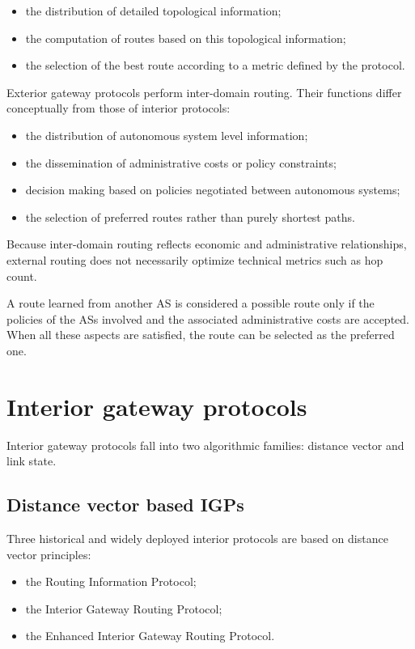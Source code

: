 \begin{itemize}
\item the distribution of detailed topological information;
\item the computation of routes based on this topological information;
\item the selection of the best route according to a metric defined by the protocol.
\end{itemize}

Exterior gateway protocols perform inter-domain routing. Their functions differ conceptually from those of interior protocols:

\begin{itemize}
\item the distribution of autonomous system level information;
\item the dissemination of administrative costs or policy constraints;
\item decision making based on policies negotiated between autonomous systems;
\item the selection of preferred routes rather than purely shortest paths.
\end{itemize}

Because inter-domain routing reflects economic and administrative relationships, external routing does not necessarily optimize technical metrics such as hop count.

A route learned from another AS is considered a possible route only if the
policies of the ASs involved and the associated administrative costs are
accepted. When all these aspects are satisfied, the route can be selected as the
preferred one.


\section{Interior gateway protocols}

Interior gateway protocols fall into two algorithmic families: distance vector and link state.

\subsection{Distance vector based IGPs}

Three historical and widely deployed interior protocols are based on distance vector principles:

\begin{itemize}
\item the Routing Information Protocol;
\item the Interior Gateway Routing Protocol;
\item the Enhanced Interior Gateway Routing Protocol.
\end{itemize}

